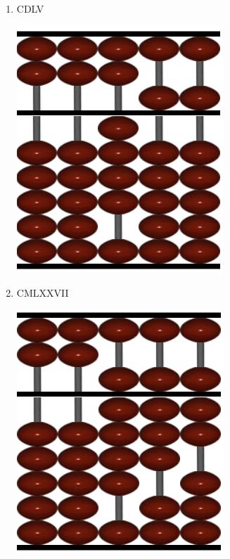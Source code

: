 \documentclass[a4paper]{article}
\begin{document}
\begin{enumerate}
\begin{enumerate}
            \vspace{0.5cm}

            \item CDLV
            \begin{center}
                \includegraphics[scale=0.6]{2b}
            \end{center}

            \newpage

            \item CMLXXVII
            \begin{center}
                \includegraphics[scale=0.6]{2c}
            \end{center}
            
            \vspace{0.5cm}


\end{enumerate}
\end{enumerate}
\end{document}
